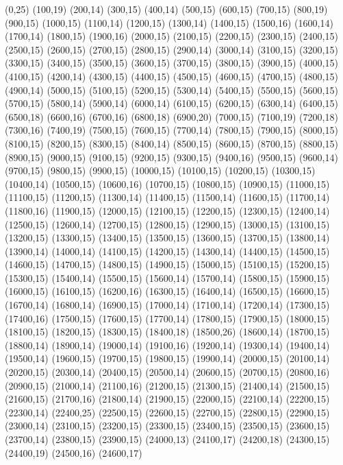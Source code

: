 (0,25)
(100,19)
(200,14)
(300,15)
(400,14)
(500,15)
(600,15)
(700,15)
(800,19)
(900,15)
(1000,15)
(1100,14)
(1200,15)
(1300,14)
(1400,15)
(1500,16)
(1600,14)
(1700,14)
(1800,15)
(1900,16)
(2000,15)
(2100,15)
(2200,15)
(2300,15)
(2400,15)
(2500,15)
(2600,15)
(2700,15)
(2800,15)
(2900,14)
(3000,14)
(3100,15)
(3200,15)
(3300,15)
(3400,15)
(3500,15)
(3600,15)
(3700,15)
(3800,15)
(3900,15)
(4000,15)
(4100,15)
(4200,14)
(4300,15)
(4400,15)
(4500,15)
(4600,15)
(4700,15)
(4800,15)
(4900,14)
(5000,15)
(5100,15)
(5200,15)
(5300,14)
(5400,15)
(5500,15)
(5600,15)
(5700,15)
(5800,14)
(5900,14)
(6000,14)
(6100,15)
(6200,15)
(6300,14)
(6400,15)
(6500,18)
(6600,16)
(6700,16)
(6800,18)
(6900,20)
(7000,15)
(7100,19)
(7200,18)
(7300,16)
(7400,19)
(7500,15)
(7600,15)
(7700,14)
(7800,15)
(7900,15)
(8000,15)
(8100,15)
(8200,15)
(8300,15)
(8400,14)
(8500,15)
(8600,15)
(8700,15)
(8800,15)
(8900,15)
(9000,15)
(9100,15)
(9200,15)
(9300,15)
(9400,16)
(9500,15)
(9600,14)
(9700,15)
(9800,15)
(9900,15)
(10000,15)
(10100,15)
(10200,15)
(10300,15)
(10400,14)
(10500,15)
(10600,16)
(10700,15)
(10800,15)
(10900,15)
(11000,15)
(11100,15)
(11200,15)
(11300,14)
(11400,15)
(11500,14)
(11600,15)
(11700,14)
(11800,16)
(11900,15)
(12000,15)
(12100,15)
(12200,15)
(12300,15)
(12400,14)
(12500,15)
(12600,14)
(12700,15)
(12800,15)
(12900,15)
(13000,15)
(13100,15)
(13200,15)
(13300,15)
(13400,15)
(13500,15)
(13600,15)
(13700,15)
(13800,14)
(13900,14)
(14000,14)
(14100,15)
(14200,15)
(14300,14)
(14400,15)
(14500,15)
(14600,15)
(14700,15)
(14800,15)
(14900,15)
(15000,15)
(15100,15)
(15200,15)
(15300,15)
(15400,14)
(15500,15)
(15600,14)
(15700,14)
(15800,15)
(15900,15)
(16000,15)
(16100,15)
(16200,16)
(16300,15)
(16400,14)
(16500,15)
(16600,15)
(16700,14)
(16800,14)
(16900,15)
(17000,14)
(17100,14)
(17200,14)
(17300,15)
(17400,16)
(17500,15)
(17600,15)
(17700,14)
(17800,15)
(17900,15)
(18000,15)
(18100,15)
(18200,15)
(18300,15)
(18400,18)
(18500,26)
(18600,14)
(18700,15)
(18800,14)
(18900,14)
(19000,14)
(19100,16)
(19200,14)
(19300,14)
(19400,14)
(19500,14)
(19600,15)
(19700,15)
(19800,15)
(19900,14)
(20000,15)
(20100,14)
(20200,15)
(20300,14)
(20400,15)
(20500,14)
(20600,15)
(20700,15)
(20800,16)
(20900,15)
(21000,14)
(21100,16)
(21200,15)
(21300,15)
(21400,14)
(21500,15)
(21600,15)
(21700,16)
(21800,14)
(21900,15)
(22000,15)
(22100,14)
(22200,15)
(22300,14)
(22400,25)
(22500,15)
(22600,15)
(22700,15)
(22800,15)
(22900,15)
(23000,14)
(23100,15)
(23200,15)
(23300,15)
(23400,15)
(23500,15)
(23600,15)
(23700,14)
(23800,15)
(23900,15)
(24000,13)
(24100,17)
(24200,18)
(24300,15)
(24400,19)
(24500,16)
(24600,17)
